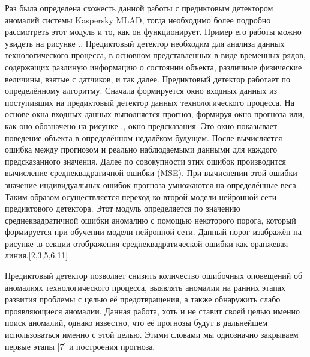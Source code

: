 {  \par \redline Раз была определена схожесть данной работы с предиктовым детектором аномалий системы Kaspersky MLAD, тогда необходимо более подробно рассмотреть этот модуль и то, как он функционирует. Пример его работы можно увидеть на рисунке \thechaptercntr .\theimagecntr. Предиктовый детектор необходим для анализа данных технологического процесса, в основном представленных в виде временных рядов, содержащих разлиную информацию о состоянии объекта, различные физические величины, взятые с датчиков, и так далее. Предиктовый детектор работает по определённому алгоритму. Сначала формируется окно входных данных из поступивших на предиктовый детектор данных технологического процесса. На основе окна входных данных выполняется прогноз, формируя окно прогноза или, как оно обозначено на рисунке \thechaptercntr .\theimagecntr, окно предсказания. Это окно показывает поведение объекта в определённом недалёком будущем. После вычисляется ошибка между прогнозом и реально наблюдаемыми данными для каждого предсказанного значения. Далее по совокупности этих ошибок производится вычисление среднеквадратичной ошибки (MSE). При вычислении этой ошибки значение индивидуальных ошибок прогноза умножаются на определённые веса. Таким образом осуществляется переход ко второй модели нейронной сети предиктового детектора. Этот модуль определяется по значению среднеквадратичной ошибки аномалию с помощью некоторого порога, который формируется при обучении модели нейронной сети. Данный порог изабражён на рисунке \thechaptercntr .\theimagecntr \spc в секции отображения среднеквадратической ошибки как оранжевая линия.[2,3,5,6,11] \addtocounter{imagecntr}{1}
  
  \par \redline Предиктовый детектор позволяет снизить количество ошибочных оповещений об аномалиях технологического процесса, выявлять аномалии на ранних этапах развития проблемы с целью её предотвращения, а также обнаружить слабо проявляющиеся аномалии. Данная работа, хоть и не ставит своей целью именно поиск аномалий, однако известно, что её прогнозы будут в дальнейшем использоваться именно с этой целью. Этими словами мы однозначно закрываем первые этапы [7] и построения прогноза.  

  \par
}

\setcounter{subchaptercntr}{1}
\setcounter{formulacntr}{1}
\setcounter{imagecntr}{1}
\setcounter{tablecntr}{1}
\setcounter{itemcntr}{1}

